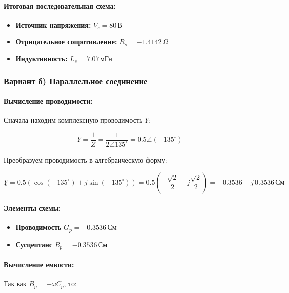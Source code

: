 \documentclass{article}
\begin{document}
\paragraph*{Итоговая последовательная схема:}

\begin{itemize}
    \item \textbf{Источник напряжения:} \( V_s = 80 \, \text{В} \)
    \item \textbf{Отрицательное сопротивление:} \( R_s = -1.4142 \, \Omega \)
    \item \textbf{Индуктивность:} \( L_s = 7.07 \, \text{мГн} \)
\end{itemize}

\subsubsection*{Вариант б) Параллельное соединение}

\paragraph*{Вычисление проводимости:}

Сначала находим комплексную проводимость \( \underline{Y} \):

\[
\underline{Y} = \frac{1}{\underline{Z}} = \frac{1}{2\angle 135^\circ} = 0.5\angle (-135^\circ)
\]

Преобразуем проводимость в алгебраическую форму:

\[
\underline{Y} = 0.5\left( \cos(-135^\circ) + j \sin(-135^\circ) \right) = 0.5\left( -\frac{\sqrt{2}}{2} - j\frac{\sqrt{2}}{2} \right) = -0.3536 - j\,0.3536 \, \text{См}
\]

\paragraph*{Элементы схемы:}

\begin{itemize}
    \item \textbf{Проводимость} \( G_p = -0.3536 \, \text{См} \)
    \item \textbf{Сусцептанс} \( B_p = -0.3536 \, \text{См} \)
\end{itemize}

\paragraph*{Вычисление емкости:}

Так как \( B_p = -\omega C_p \), то:
\end{document}
